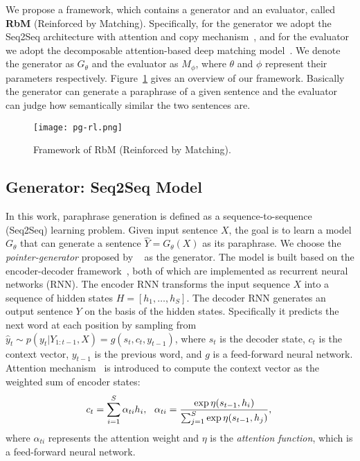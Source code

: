 \documentclass[11pt,a4paper]{article}
\begin{document}
We propose a framework, which contains a generator and an evaluator, called \textbf{RbM} (Reinforced by Matching). Specifically, for the generator we adopt the Seq2Seq architecture with attention and copy mechanism~\citep{bahdanau2014neural,see2017get}, and for the evaluator we adopt the decomposable attention-based deep matching model~\citep{parikh2016decomposable}. We denote the generator as $G_{\theta}$ and the evaluator as $M_{\phi}$, where $\theta$ and $\phi$ represent their parameters respectively. Figure~\ref{fig:pg-rl} gives an overview of our framework. Basically the generator can generate a paraphrase of a given sentence and the evaluator can judge how semantically similar the two sentences are.

    \begin{figure}[t!]
    \begin{center}
         \texttt{[image: pg-rl.png]}
        \caption{Framework of RbM (Reinforced by Matching).} %
        \label{fig:pg-rl}
    \end{center}\vspace{-15pt}
    \end{figure}

    \subsection{Generator: Seq2Seq Model}\label{sec:seq2seq}
    In this work, paraphrase generation is defined as a sequence-to-sequence (Seq2Seq) learning problem. Given input sentence $X$, the goal is to learn a model $G_{\theta}$ that can generate a sentence $\hat{Y}=G_{\theta}(X)$ as its paraphrase. We choose the \textit{pointer-generator} proposed by ~\citet{see2017get} as the generator. The model is built based on the encoder-decoder framework~\citep{cho2014learning,sutskever2014sequence}, both of which are implemented as recurrent neural networks (RNN). The encoder RNN transforms the input sequence $X$ into a sequence of hidden states $H=[h_1,\ldots,h_S]$. The decoder RNN generates an output sentence $Y$ on the basis of the hidden states. Specifically it predicts the next word at each position by sampling from $\hat{y}_{t} \sim p(y_t|Y_{1:t-1},X)=g(s_{t}, c_{t}, y_{t-1})$, where $s_t$ is the decoder state, $c_t$ is the context vector, $y_{t-1}$ is the previous word, and $g$ is a feed-forward neural network. Attention mechanism~\citep{bahdanau2014neural} is introduced to compute the context vector as the weighted sum of encoder states:
    \[
        c_t=\sum_{i=1}^S\alpha_{ti}h_{i},\ \  \alpha_{ti} = \frac{\exp{\eta(s_{t-1}, h_{i})}}{\sum_{j=1}^S \exp\eta(s_{t-1}, h_{j})},\\
    \]
    where $\alpha_{ti}$ represents the attention weight and $\eta$ is the \textit{attention function}, which is a feed-forward neural network.
\end{document}
